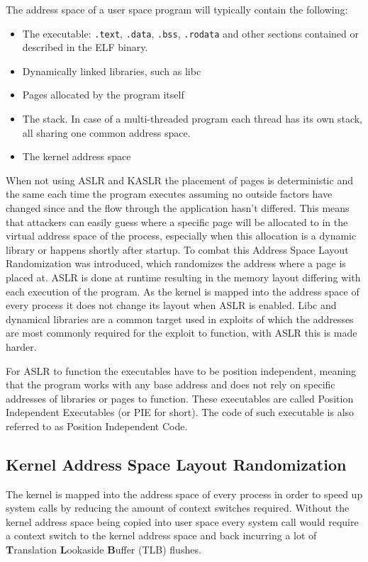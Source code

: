 The address space of a user space program will typically contain the following:

\begin{itemize}
  \item The executable: \lstinline{.text}, \lstinline{.data}, \lstinline{.bss}, \lstinline{.rodata} and other sections contained or described in the ELF binary.
  \item Dynamically linked libraries, such as libc
  \item Pages allocated by the program itself
  \item The stack. In case of a multi-threaded program each thread has its own stack, all sharing one common address space.
  \item The kernel address space
\end{itemize}

When not using ASLR and KASLR the placement of pages is deterministic and the same each time the program executes assuming no outside factors have changed since and the flow through the application hasn't differed.
This means that attackers can easily guess where a specific page will be allocated to in the virtual address space of the process, especially when this allocation is a dynamic library or happens shortly after startup.
To combat this Address Space Layout Randomization was introduced, which randomizes the address where a page is placed at.
ASLR is done at runtime resulting in the memory layout differing with each execution of the program.
As the kernel is mapped into the address space of every process it does not change its layout when ASLR is enabled.
Libc and dynamical libraries are a common target used in exploits of which the addresses are most commonly required for the exploit to function, with ASLR this is made harder.

For ASLR to function the executables have to be position independent, meaning that the program works with any base address and does not rely on specific addresses of libraries or pages to function.
These executables are called Position Independent Executables (or PIE for short).
The code of such executable is also referred to as Position Independent Code.

\subsection{Kernel Address Space Layout Randomization}

The kernel is mapped into the address space of every process in order to speed up system calls by reducing the amount of context switches required.
Without the kernel address space being copied into user space every system call would require a context switch to the kernel address space and back incurring a lot of \textbf{T}ranslation \textbf{L}ookaside \textbf{B}uffer (TLB) flushes.

